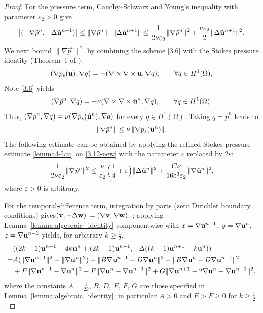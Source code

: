 \documentclass{article}
\theoremstyle{definition}                   %
\begin{document}
\begin{proof}
For the pressure term, Cauchy--Schwarz and Young's inequality with parameter
$\varepsilon_2>0$ give
\begin{align}
\bigl|(-\nabla \hat p^n, -\Delta \hat{\bf u}^{n+1})\bigr|
\le \|\nabla\hat p^n\|\cdot\|\Delta\hat{\bf u}^{n+1}\|
\le \frac{1}{2\nu\varepsilon_2}\|\nabla\hat p^n\|^2
+\frac{\nu\varepsilon_2}{2}\|\Delta\hat{\bf u}^{n+1}\|^2.
\label{3.9-new}
\end{align}
We next bound $\|\nabla\hat p^n\|^2$ by combining the scheme \eqref{3.6} with
the Stokes pressure identity (Theorem~1 of
\cite{LiuLiuPego2007}):
\begin{align}
(\nabla p_s({\bf u}), \nabla q) = - (\nabla\times\nabla\times{\bf u}, \nabla q),
\qquad\forall q\in H^1(\Omega),
\label{3.10}
\end{align}
Note \eqref{3.6} yields
\begin{equation}
(\nabla \hat{p}^{n},\nabla q)=
-\nu (\nabla\times\nabla\times \hat{\bf u}^{n},\nabla q), \qquad \forall q\in H^1(\Omega).
\label{3.11}
\end{equation}
Thus, 
$(\nabla \hat{p}^{n},\nabla q)=\nu(\nabla p_s(\hat{\bf u}^n),\nabla q)$ for every
$q\in H^1(\Omega)$. Taking $q=\hat{p}^{n}$ leads to
\begin{equation}
\|\nabla\hat p^n\|\le\nu\,\|\nabla p_s(\hat{\bf u}^n)\|.
\label{3.12-new}
\end{equation}
The following estimate can be obtained by applying the refined Stokes pressure estimate \eqref{lemma4-Liu} on \eqref{3.12-new} with the parameter
$\varepsilon$ replaced by $2\varepsilon$:
\begin{align}
\frac{1}{2\nu\varepsilon_2}\|\nabla\hat p^n\|^2
\le\frac{\nu}{\varepsilon_2}\Bigl(\frac14+\varepsilon\Bigr)\|\Delta\hat{\bf u}^n\|^2
+\frac{C\nu}{16\varepsilon^3\varepsilon_2}\|\nabla\hat{\bf u}^n\|^2,
\label{3.13-new}
\end{align}
where $\varepsilon>0$ is arbitrary.

For the temporal-difference term, integration by parts (zero Dirichlet
boundary conditions) gives$({\bf v},-\Delta{\bf w})$
$= (\nabla{\bf v},\nabla{\bf w})$.  ;
applying Lemma~\ref{lemma:algebraic_identity} componentwise with
$x=\nabla{\bf u}^{n+1}$, $y=\nabla{\bf u}^n$, $z=\nabla{\bf u}^{n-1}$ yields,
for arbitrary $k\ge\tfrac12$,
\begin{align}
&((2k+1){\bf u}^{n+1} - 4k{\bf u}^n + (2k-1){\bf u}^{n-1},
-\Delta ((k+1){\bf u}^{n+1} - k{\bf u}^n)) \notag\\
=&A(\|\nabla{\bf u}^{n+1}\|^2 - \|\nabla{\bf u}^{n}\|^2)
+\|B\nabla{\bf u}^{n+1} - D\nabla{\bf u}^n\|^2
- \|B\nabla{\bf u}^{n} - D\nabla{\bf u}^{n-1}\|^2 \notag\\
& + E\|\nabla{\bf u}^{n+1} - \nabla{\bf u}^n\|^2
- F\|\nabla{\bf u}^{n} - \nabla{\bf u}^{n-1}\|^2
+G \|\nabla{\bf u}^{n+1} - 2\nabla{\bf u}^n + \nabla{\bf u}^{n-1} \|^2,
 \label{3.16_New}
\end{align}
where the constants $A=\frac{1}{2k}$, $B$, $D$, $E$, $F$, $G$ are those
specified in Lemma~\ref{lemma:algebraic_identity}; in particular $A>0$ and
$E>F\ge 0$ for $k\ge\tfrac12$.




\end{proof}
\end{document}
